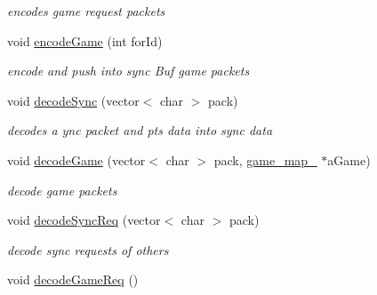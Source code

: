 \begin{DoxyCompactItemize}
\begin{DoxyCompactList}\small\item\em encodes game request packets \end{DoxyCompactList}\item 
void \hyperlink{class_network_adbef3dc502d14837b6f617dca60cd740}{encode\+Game} (int for\+Id)
\begin{DoxyCompactList}\small\item\em encode and push into sync Buf game packets \end{DoxyCompactList}\item 
void \hyperlink{class_network_a8e8fbc79b2d3101cdd0b2162d5cf57ac}{decode\+Sync} (vector$<$ char $>$ pack)
\begin{DoxyCompactList}\small\item\em decodes a ync packet and pts data into sync data \end{DoxyCompactList}\item 
void \hyperlink{class_network_a26fe81bc20bf31fcc741004c9fcd9c97}{decode\+Game} (vector$<$ char $>$ pack, \hyperlink{classgame__map__}{game\+\_\+map\+\_\+} $\ast$a\+Game)
\begin{DoxyCompactList}\small\item\em decode game packets \end{DoxyCompactList}\item 
void \hyperlink{class_network_a0ff837b11d772e8af91a027e915f15ea}{decode\+Sync\+Req} (vector$<$ char $>$ pack)
\begin{DoxyCompactList}\small\item\em decode sync requests of others \end{DoxyCompactList}\item 
\hypertarget{class_network_a4e224dd40f84385e75421b8cb91d278a}{void \hyperlink{class_network_a4e224dd40f84385e75421b8cb91d278a}{decode\+Game\+Req} ()}\label{class_network_a4e224dd40f84385e75421b8cb91d278a}


\end{DoxyCompactItemize}

